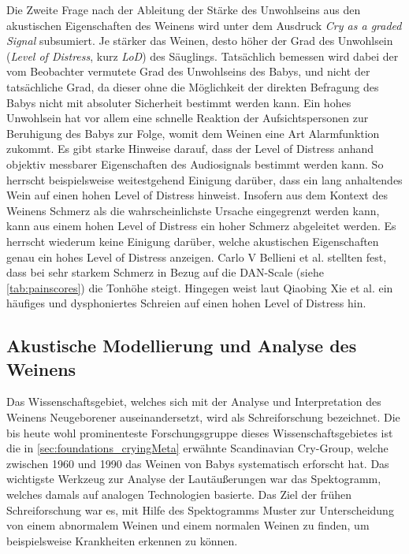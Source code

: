 Die Zweite Frage nach der Ableitung der Stärke des Unwohlseins aus den akustischen Eigenschaften des Weinens wird unter dem Ausdruck \emph{Cry as a graded Signal} subsumiert. Je \glqq stärker\grqq{} das Weinen, desto höher der Grad des Unwohlsein (\emph{Level of Distress}, kurz \emph{LoD}) des Säuglings. Tatsächlich bemessen wird dabei der vom Beobachter vermutete Grad des Unwohlseins des Babys, und nicht der tatsächliche Grad, da dieser ohne die Möglichkeit der direkten Befragung des Babys nicht mit absoluter Sicherheit bestimmt werden kann. Ein hohes Unwohlsein hat vor allem eine schnelle Reaktion der Aufsichtspersonen zur Beruhigung des Babys zur Folge, womit dem Weinen eine Art Alarmfunktion zukommt. Es gibt starke Hinweise darauf, dass der Level of Distress anhand objektiv messbarer Eigenschaften des Audiosignals bestimmt werden kann. So herrscht beispielsweise weitestgehend Einigung darüber, dass ein \glqq lang\grqq{} anhaltendes Wein auf einen hohen Level of Distress hinweist. Insofern aus dem Kontext des Weinens Schmerz als die wahrscheinlichste Ursache eingegrenzt werden kann, kann aus einem hohen Level of Distress ein hoher Schmerz abgeleitet werden.\cite[S. 13 - 17]{signal}\cite{lod} Es herrscht wiederum keine Einigung darüber, welche akustischen Eigenschaften genau ein hohes Level of Distress anzeigen. Carlo V Bellieni et al. \cite{dan} stellten fest, dass bei sehr starkem Schmerz in Bezug auf die DAN-Scale (siehe \autoref{tab:painscores}) die Tonhöhe steigt. Hingegen weist laut Qiaobing Xie et al. \cite{lod} ein häufiges und dysphoniertes Schreien auf einen hohen Level of Distress hin.

\subsection{Akustische Modellierung und Analyse des Weinens}
\label{sec:acousticModel}

Das Wissenschaftsgebiet, welches sich mit der Analyse und Interpretation des Weinens Neugeborener auseinandersetzt, wird als \glqq Schreiforschung\grqq{} bezeichnet. Die bis heute wohl prominenteste Forschungsgruppe dieses Wissenschaftsgebietes ist die in \autoref{sec:foundations_cryingMeta} erwähnte \glqq Scandinavian Cry-Group\grqq \cite{crygroup}, welche zwischen 1960 und 1990 das Weinen von Babys systematisch erforscht hat. Das wichtigste Werkzeug zur Analyse der Lautäußerungen war das Spektogramm, welches damals auf analogen Technologien basierte. Das Ziel der frühen Schreiforschung war es, mit Hilfe des Spektogramms Muster zur Unterscheidung von einem abnormalem Weinen und einem normalen Weinen zu finden, um beispielsweise Krankheiten erkennen zu können.\cite[S. 142]{signal} 

